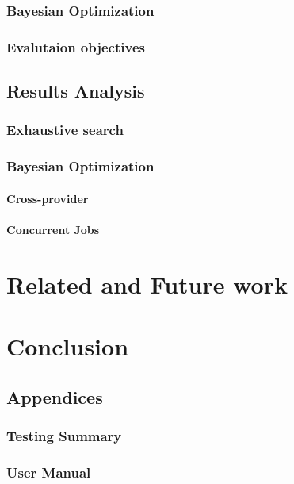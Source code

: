 \documentclass{report}
\begin{document}
\subsection{Bayesian Optimization}
\subsection{Evalutaion objectives}
\section{Results Analysis}
\subsection{Exhaustive search}
\subsection{Bayesian Optimization}
\subsubsection{Cross-provider}
\subsubsection{Concurrent Jobs}
\chapter{Related and Future work}
\chapter{Conclusion}

\newpage
\cite{Agarwal2012}


\newpage
\section*{Appendices}
\subsection*{Testing Summary}
\subsection*{User Manual}
\end{document}
